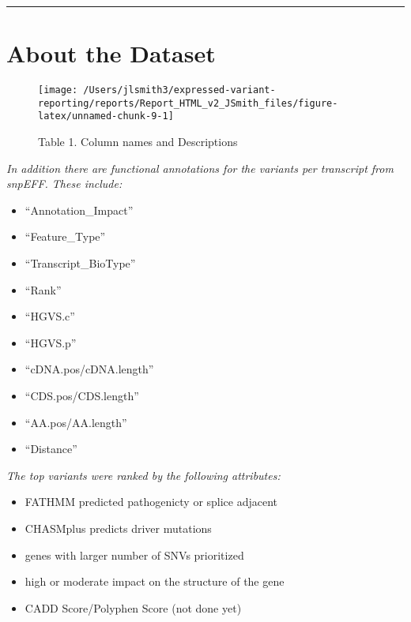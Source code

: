 \documentclass[
]{article}
\providecommand{\tightlist}{%
  \setlength{\itemsep}{0pt}\setlength{\parskip}{0pt}}
\begin{document}
\begin{center}\rule{0.5\linewidth}{0.5pt}\end{center}

\hypertarget{about-the-dataset}{%
\section{About the Dataset}\label{about-the-dataset}}

\begin{figure}

{\centering \texttt{[image: /Users/jlsmith3/expressed-variant-reporting/reports/Report\_HTML\_v2\_JSmith\_files/figure-latex/unnamed-chunk-9-1]} 

}

\caption{Table 1. Column names and Descriptions}\label{fig:unnamed-chunk-9}
\end{figure}

\emph{In addition there are functional annotations for the variants per
transcript from snpEFF. These include:}

\begin{itemize}
\tightlist
\item
  ``Annotation\_Impact''
\item
  ``Feature\_Type''
\item
  ``Transcript\_BioType''
\item
  ``Rank''
\item
  ``HGVS.c''
\item
  ``HGVS.p''
\item
  ``cDNA.pos/cDNA.length''
\item
  ``CDS.pos/CDS.length''
\item
  ``AA.pos/AA.length''
\item
  ``Distance''
\end{itemize}

\emph{The top variants were ranked by the following attributes:}

\begin{itemize}
\tightlist
\item
  FATHMM predicted pathogenicty or splice adjacent
\item
  CHASMplus predicts driver mutations
\item
  genes with larger number of SNVs prioritized
\item
  high or moderate impact on the structure of the gene
\item
  CADD Score/Polyphen Score (not done yet)
\end{itemize}
\end{document}
